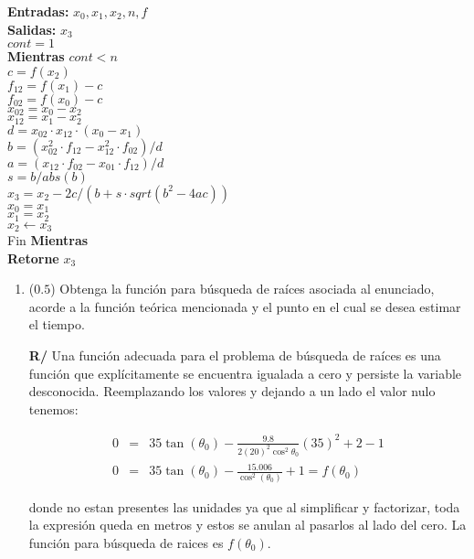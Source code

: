 \documentclass[12pt]{article}
\begin{document}
\begin{enumerate}[leftmargin=*,widest=9]
{\scriptsize
\textbf{Entradas:} \(x_0, x_1, x_2, n, f\)\\
\textbf{Salidas:} \(x_3\)\\
\(cont = 1\)\\
\textbf{Mientras} \(cont < n\)\\
\(c = f(x_2)\)\\
\(f_{12} = f(x_1) - c\)\\
\(f_{02} = f(x_0) - c\)\\
\(x_{02} = x_0 - x_2\)\\
\(x_{12} = x_1 - x_2\)\\
\(d = x_{02} \cdot x_{12} \cdot (x_0 - x_1)\)\\
\(b = (x_{02}^2 \cdot f_{12} - x_{12}^2 \cdot f_{02}) / d\)\\
\(a = (x_{12} \cdot f_{02} - x_{01} \cdot f_{12}) / d\)\\
\(s = b / abs(b)\)\\
\(x_3 = x_2 - 2 c / (b + s \cdot sqrt(b^2 - 4 a c))\)\\
\(x_0 = x_1\)\\
\(x_1 = x_2\)\\
\(x_2 \leftarrow x_3\)\\
Fin \textbf{Mientras}\\
\textbf{Retorne} \(x_3\)\\
}
\vspace{-.8cm}

\begin{enumerate}[label=\alph*]
\item (\(0.5\)) Obtenga la función para búsqueda de raíces asociada al enunciado, acorde a la función teórica mencionada y el punto en el cual se desea estimar el tiempo.

\textbf{R/} Una función adecuada para el problema de búsqueda de raíces es una función que explícitamente se encuentra igualada a cero y persiste la variable desconocida. Reemplazando los valores y dejando a un lado el valor nulo tenemos:

\begin{eqnarray*}
0&=&35\tan(\theta_{0}) - \frac{9.8}{2(20)^{2}\cos^{2}\theta_{0}}(35)^{2}+2 - 1 \\
0&=&35\tan(\theta_{0}) - \frac{15.006}{\cos^{2}(\theta_{0})} + 1 = f(\theta_0)
\end{eqnarray*}

donde no estan presentes las unidades ya que al simplificar y factorizar, toda la expresión queda en metros y estos se anulan al pasarlos al lado del cero. La función para búsqueda de raices es \(f(\theta_0)\).


\end{enumerate}
\end{enumerate}
\end{document}
